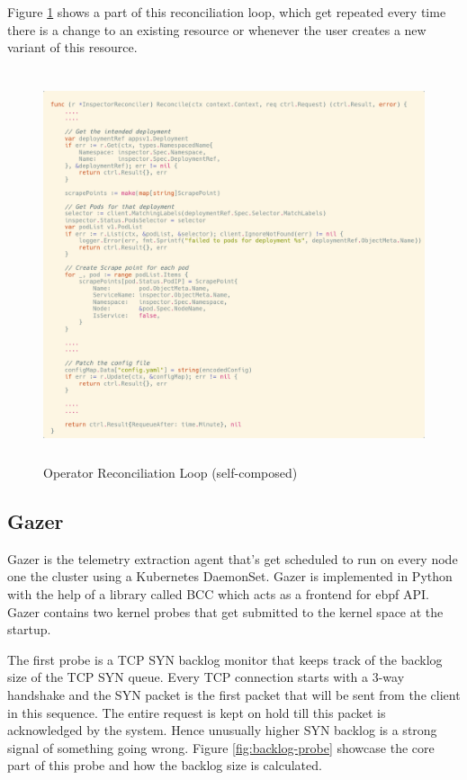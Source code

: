 Figure \ref{fig:reconcile-loop} shows a part of this reconciliation loop, which get repeated every time there is a change to an existing resource or whenever the user creates a new variant of this resource.

\begin{figure}[H]
    \includegraphics[height=11.5cm]{assets/implementation/reconcile-loop.png}
    \caption{Operator Reconciliation Loop (self-composed)}
    \label{fig:reconcile-loop}
\end{figure}



\subsection{Gazer}

Gazer is the telemetry extraction agent that's get scheduled to run on every node one the cluster using a Kubernetes DaemonSet. Gazer is implemented in Python with the help of a library called BCC which acts as a frontend for \ac{ebpf} API. Gazer contains two kernel probes that get submitted to the kernel space at the startup. 

The first probe is a TCP SYN backlog monitor that keeps track of the backlog size of the TCP SYN queue. Every TCP connection starts with a 3-way handshake and the SYN packet is the first packet that will be sent from the client in this sequence. The entire request is kept on hold till this packet is acknowledged by the system. Hence unusually higher SYN backlog is a strong signal of something going wrong. Figure \ref{fig:backlog-probe} showcase the core part of this probe and how the backlog size is calculated.

